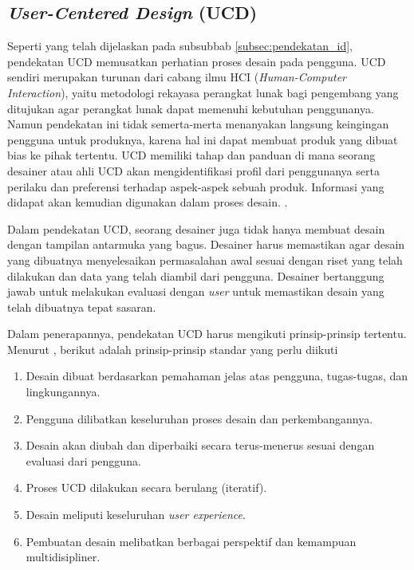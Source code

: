 \subsection{\textit{User-Centered Design} (UCD)}
Seperti yang telah dijelaskan pada subsubbab \ref{subsec:pendekatan_id}, pendekatan UCD memusatkan perhatian proses desain pada pengguna. UCD sendiri merupakan turunan dari cabang ilmu HCI (\textit{Human-Computer Interaction}), yaitu metodologi rekayasa perangkat lunak bagi pengembang yang ditujukan agar perangkat lunak dapat memenuhi kebutuhan penggunanya. \parencite{lowdermilk2013user} Namun pendekatan ini tidak semerta-merta menanyakan langsung keingingan pengguna untuk produknya, karena hal ini dapat membuat produk yang dibuat bias ke pihak tertentu. UCD memiliki tahap dan panduan di mana seorang desainer atau ahli UCD akan mengidentifikasi profil dari penggunanya serta perilaku dan preferensi terhadap aspek-aspek sebuah produk. Informasi yang didapat akan kemudian digunakan dalam proses desain. \parencite{10.1145/1621995.1621997}.

Dalam pendekatan UCD, seorang desainer juga tidak hanya membuat desain dengan tampilan antarmuka yang bagus. Desainer harus memastikan agar desain yang dibuatnya menyelesaikan permasalahan awal sesuai dengan riset yang telah dilakukan dan data yang telah diambil dari pengguna. Desainer bertanggung jawab untuk melakukan evaluasi dengan \textit{user} untuk memastikan desain yang telah dibuatnya tepat sasaran. \parencite{lowdermilk2013user}

Dalam penerapannya, pendekatan UCD harus mengikuti prinsip-prinsip tertentu. Menurut \textcite{iso9241-210:2010}, berikut adalah prinsip-prinsip standar yang perlu diikuti

\begin{enumerate}
  \item Desain dibuat berdasarkan pemahaman jelas atas pengguna, tugas-tugas, dan lingkungannya.
  \item Pengguna dilibatkan keseluruhan proses desain dan perkembangannya.
  \item Desain akan diubah dan diperbaiki secara terus-menerus sesuai dengan evaluasi dari pengguna.
  \item Proses UCD dilakukan secara berulang (iteratif).
  \item Desain meliputi keseluruhan \textit{user experience}.
  \item Pembuatan desain melibatkan berbagai perspektif dan kemampuan multidisipliner.
\end{enumerate}

